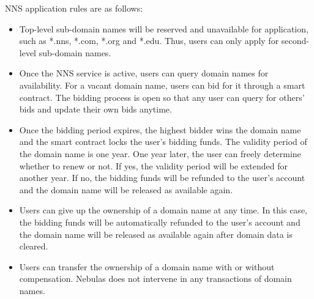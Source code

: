 NNS application rules are as follows:
\begin{itemize}

	\item Top-level sub-domain names will be reserved and unavailable for application, such as *.nns, *.com, *.org and *.edu. Thus, users can only apply for second-level sub-domain names.
	\item Once the NNS service is active, users can query domain names for availability. For a vacant domain name, users can bid for it through a smart contract. The bidding process is open so that any user can query for others' bids and update their own bids anytime.
	\item Once the bidding period expires, the highest bidder wins the domain name and the smart contract locks the user's bidding funds. The validity period of the domain name is one year. One year later, the user can freely determine whether to renew or not. If yes, the validity period will be extended for another year. If no, the bidding funds will be refunded to the user's account and the domain name will be released as available again.
	\item Users can give up the ownership of a domain name at any time. In this case, the bidding funds will be automatically refunded to the user's account and the domain name will be released as available again after domain data is cleared.
	\item Users can transfer the ownership of a domain name with or without compensation. Nebulas does not intervene in any transactions of domain names.
	
\end{itemize}


